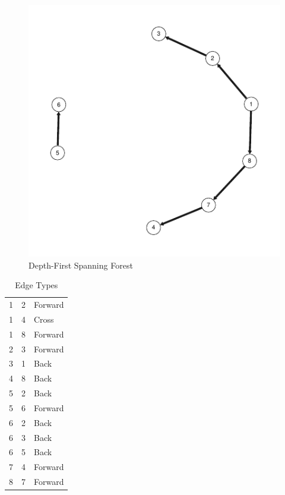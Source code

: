 \documentclass[10pt]{article}\usepackage[]{graphicx}\usepackage[]{xcolor}
\makeatletter
\def\maxwidth{ %
  \ifdim\Gin@nat@width>\linewidth
    \linewidth
  \else
    \Gin@nat@width
  \fi
}
\newenvironment{knitrout}{}{} %
\makeatother
\begin{document}
\begin{easylist}[enumerate]
\begin{knitrout}
\color{fgcolor}\begin{figure}[H]


{\centering \includegraphics[width=\maxwidth]{figure/ps8_1forest} 

}

\caption[Depth-First Spanning Forest]{Depth-First Spanning Forest\label{fig:ps8.1forest}}
\end{figure}


\end{knitrout}


    \begin{table}[H]
        \centering
        \begin{tabular}{|l|l|l|}
            \hline
            1 & 2 & Forward\\
            1 & 4 & Cross\\
            1 & 8 & Forward\\
            2 & 3 & Forward\\
            3 & 1 & Back\\
            4 & 8 & Back\\
            5 & 2 & Back\\
            5 & 6 & Forward\\
            6 & 2 & Back\\
            6 & 3 & Back\\
            6 & 5 & Back\\
            7 & 4 & Forward\\
            8 & 7 & Forward\\
            \hline
        \end{tabular}
        \caption{Edge Types}
        \label{table:edgetypes}
    \end{table}


\end{easylist}
\end{document}
